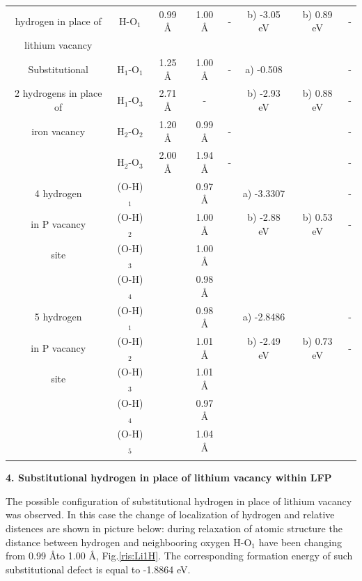 \begin{adjustbox}{angle=90}
{\begin{tabular}{|c|c|c|c|c|c|c|c|}
            hydrogen in place of  & H-O$_1$ & 0.99 \AA & 1.00 \AA & - & b) -3.05 eV & b) 0.89 eV & - \\
            lithium vacancy  &  & & & & & & \\
            \hline
            Substitutional & H$_1$-O$_1$ & 1.25 \AA & 1.00 \AA & - & a) -0.508 & & - \\
            2 hydrogens in place of  & H$_1$-O$_3$ & 2.71 \AA & - & & b) -2.93 eV & b) 0.88 eV & -\\
            iron vacancy  & H$_2$-O$_2$ & 1.20 \AA & 0.99 \AA & - & & &- \\
            & H$_2$-O$_3$ & 2.00 \AA & 1.94 \AA & - & & & -\\
            \hline
            4 hydrogen & (O-H)$_{1}$ &  & 0.97 \AA &  & a) -3.3307 & & - \\ 
            in P vacancy & (O-H)$_{2}$ & & 1.00 \AA& & b) -2.88 eV & b) 0.53 eV & - \\
            site  & (O-H)$_{3}$ & & 1.00 \AA & & & & \\
            & (O-H)$_{4}$ & & 0.98 \AA & & & & \\
            \hline
            5 hydrogen & (O-H)$_{1}$ & &  0.98 \AA &  & a) -2.8486 & & -\\ 
            in P vacancy & (O-H)$_{2}$ & & 1.01 \AA & &b) -2.49 eV &b) 0.73 eV & -\\
            site  & (O-H)$_{3}$ & & 1.01 \AA & & & & \\
            & (O-H)$_{4}$ & & 0.97 \AA & & & & \\
            & (O-H)$_{5}$ & & 1.04 \AA & & & & \\
            \hline
            \label{tabular:Liinter}
        \end{tabular}}
\end{adjustbox}



\newpage

\textbf{4. Substitutional hydrogen in place of lithium vacancy within LFP}

The possible configuration of substitutional hydrogen in place of lithium vacancy was observed. In this case the change of localization of hydrogen and relative distences are shown in picture below: during relaxation of atomic structure the distance between hydrogen and neighbooring oxygen H-O$_1$ have been changing from 0.99 \AA to 1.00 \AA, Fig.\ref{ris:Li1H}. The corresponding formation energy of such substitutional defect is equal to -1.8864 eV.

